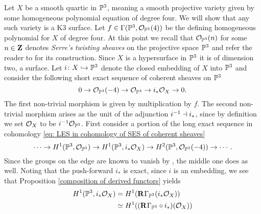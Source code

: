 \begin{example}
    Let $X$ be a smooth quartic in $\mathbb P^3$, meaning a smooth projective variety given by some homogeneous polynomial equation of degree four.
    We will show that any such variety is a K3 surface. Let $f \in \Gamma(\mathbb P^3, {\mathcal{O}_{\mathbb P^3}}(4))$ be the defining homogeneous polynomial for $X$ of degree four.
    At this point we recall that ${\mathcal{O}_{\mathbb P^3}}(n)$ for some $n \in \mathbf Z$ denotes \emph{Serre's twisting sheaves} on the projective space $\mathbb P^3$ and refer the reader to \cite[\S II.5]{Hartshorne1977} for its construction.
    Since $X$ is a hypersurface in $\mathbb P^3$ it is of dimension two, \ie a surface. Let $i \colon X \hookrightarrow \mathbb P^3$ denote the closed embedding of $X$ into $\mathbb P^3$ and consider the following short exact sequence of coherent sheaves on $\mathbb P^3$
    \[
        0 \to {\mathcal{O}_{\mathbb P^3}}(-4) \to {\mathcal{O}_{\mathbb P^3}} \to i_*{\mathcal{O}_{X}} \to 0.
    \]
    The first non-trivial morphism is given by multiplication by $f$.
    The second non-trivial morphism arises as the unit of the adjunction $i^{-1} \dashv i_*$, since by definition we set ${\mathcal{O}_{X}}$ to be $i^{-1}{\mathcal{O}_{\mathbb P^3}}$.
    First consider a portion of the long exact sequence in cohomology \eqref{eq: LES in cohomology of SES of coherent sheaves}
    \[
        \cdots \to H^{1}(\mathbb P^3, {\mathcal{O}_{\mathbb P^3}}) \to H^{1}(\mathbb P^3, i_*{\mathcal{O}_{X}}) \to H^{2}(\mathbb P^3, {\mathcal{O}_{\mathbb P^3}}(-4)) \to \cdots.
    \]
    Since the groups on the edge are known to vanish by \cite[\S III, Theorem 5.1]{Hartshorne1977}, the middle one does as well. Noting that the push-forward $i_*$ is exact, since $i$ is an embedding, we see that Proposition \ref{composition of derived functors} yields
    \begin{align*}
        \cohom{1}{\PP^3}{i_*\struct{X}} &=
        H^1(\rderived{}{\Gamma_{\PP^3}}(i_*\struct{X})) \\
        &\iso H^1((\rderived{}{\Gamma_{\PP^3} \circ i_*})(\struct{X})) \\

\end{align*}
\end{example}
